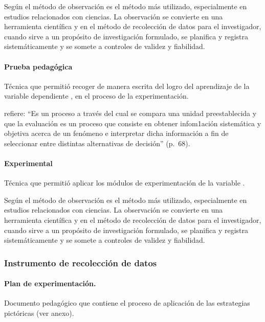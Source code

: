 \documentclass[12pt,a4paper]{article}
\begin{document}
%
Según \cite{paz_metodologiinvestigacion_2014} el método de observación es el método más utilizado, especialmente en estudios relacionados con ciencias. La observación se convierte en una herramienta científica y en el método de recolección de datos para el investigador, cuando sirve a un propósito de investigación formulado, se planifica y registra sistemáticamente y se somete a controles de validez y fiabilidad.

\paragraph{Prueba pedagógica} Técnica que permitió recoger de manera escrita del  \MakeTextLowercase{\variablei} logro del aprendizaje de la variable dependiente \MakeTextLowercase{\variabled}, en el proceso de la experimentación.

\cite{hernandez_sampieri_metodologiinvestigacion_2014} refiere: ``Es un proceso a través del cual se compara una unidad preestablecida y que la evaluación es un proceso que consiste en obtener infom1ación sistemática y objetiva acerca de un fenómeno e interpretar dicha información a fin de seleccionar entre distintas alternativas de decisión'' (p.~68).

\paragraph{Experimental} Técnica que permitió aplicar los módulos de experimentación de la variable \variablei.


{Según \cite{kothari_research_2004} el método de observación es el método más utilizado, especialmente en estudios relacionados con ciencias. La observación se convierte en una herramienta científica y en el método de recolección de datos para el investigador, cuando sirve a un propósito de investigación formulado, se planifica y registra sistemáticamente y se somete a controles de validez y fiabilidad.}

\subsubsection{Instrumento de recolección de datos}

\paragraph{Plan de experimentación.} Documento pedagógico que contiene el proceso de aplicación de las estrategias pictóricas (ver anexo).
\end{document}
